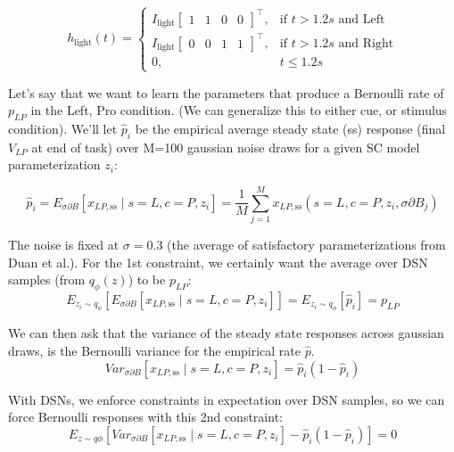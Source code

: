 \documentclass[11pt]{article}
\begin{document}
\begin{equation}  h_{\text{light}}(t) = \begin{cases}
                           I_{\text{light}} \begin{bmatrix} 1 & 1 & 0 & 0 \end{bmatrix}^\top,& \text{if } t > 1.2s \text{ and Left} \\
                           I_{\text{light}} \begin{bmatrix} 0 & 0 & 1 & 1 \end{bmatrix}^\top,& \text{if } t > 1.2s \text{ and Right} \\
                            0,              & t \leq 1.2s
                         \end{cases} 
\end{equation}

Let's say that we want to learn the parameters that produce a Bernoulli rate of $p_{LP}$ in the Left, Pro condition.  (We can generalize this to either cue, or stimulus condition).  We'll let $\hat{p}_i$ be the empirical average steady state (ss) response (final $V_{LP}$ at end of task) over M=100 gaussian noise draws for a given SC model parameterization $z_i$:

\begin{equation}
 \hat{p}_i = E_{\sigma \partial B} \left[ x_{LP,\text{ss}} \mid s=L, c=P, z_i \right] = \frac{1}{M}\sum_{j=1}^M x_{LP,\text{ss}}(s=L, c=P, z_i, \sigma \partial B_j)
 \end{equation}

The noise is fixed at $\sigma = 0.3$ (the average of satisfactory parameterizations from Duan et al.).  For the 1st constraint, we certainly want the average over DSN samples (from $q_\phi(z)$) to be $p_{LP}$:
\begin{equation}
E_{z_i \sim q_\phi} \left[ E_{\sigma \partial B} \left[ x_{LP,\text{ss}} \mid s=L, c=P, z_i \right] \right] = E_{z_i \sim q_\phi} \left[ \hat{p}_i \right] = p_{LP}
\end{equation}

We can then ask that the variance of the steady state responses across gaussian draws, is the Bernoulli variance for the empirical rate $\hat{p}$.
\begin{equation}
 Var_{\sigma \partial B} \left[ x_{LP,\text{ss}} \mid s=L, c=P, z_i \right] = \hat{p}_i(1 - \hat{p}_i)
\end{equation}

With DSNs, we enforce constraints in expectation over DSN samples, so we can force Bernoulli responses with this 2nd constraint:
\begin{equation}
E_{z \sim q\phi} \left[ Var_{\sigma \partial B} \left[ x_{LP,\text{ss}} \mid s=L, c=P, z_i \right] - \hat{p}_i(1 - \hat{p}_i) \right] = 0
\end{equation}
\end{document}
